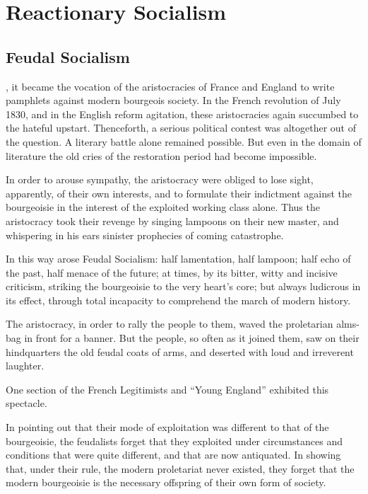 \section*{Reactionary Socialism}

\subsection*{Feudal Socialism}

, it became the vocation of the
aristocracies of France and England to write pamphlets against modern
bourgeois society. In the French revolution of July 1830, and in the
English reform agitation, these aristocracies again succumbed to the
hateful upstart. Thenceforth, a serious political contest was
altogether out of the question. A literary battle alone remained
possible. But even in the domain of literature the old cries of the
restoration period had become impossible.

In order to arouse sympathy, the aristocracy were obliged to lose
sight, apparently, of their own interests, and to formulate their
indictment against the bourgeoisie in the interest of the exploited
working class alone. Thus the aristocracy took their revenge by singing
lampoons on their new master, and whispering in his ears sinister
prophecies of coming catastrophe.

In this way arose Feudal Socialism: half lamentation, half lampoon;
half echo of the past, half menace of the future; at times, by its
bitter, witty and incisive criticism, striking the bourgeoisie to the
very heart’s core; but always ludicrous in its effect, through total
incapacity to comprehend the march of modern history.

The aristocracy, in order to rally the people to them, waved the
proletarian alms-bag in front for a banner. But the people, so often as
it joined them, saw on their hindquarters the old feudal coats of arms,
and deserted with loud and irreverent laughter.

One section of the French Legitimists and \enquote{Young England} exhibited
this spectacle.

In pointing out that their mode of exploitation was different to that
of the bourgeoisie, the feudalists forget that they exploited under
circumstances and conditions that were quite different, and that are
now antiquated. In showing that, under their rule, the modern
proletariat never existed, they forget that the modern bourgeoisie is
the necessary offspring of their own form of society.

